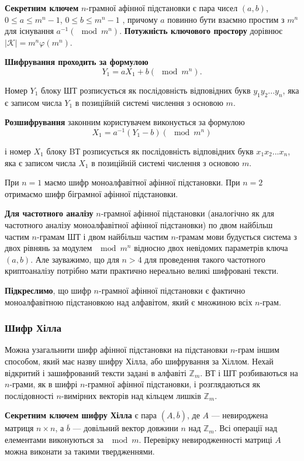 \textbf{Секретним ключем} $n$-грамної афінної підстановки є пара чисел $(a, b)$,
$0 \leqslant a \leqslant m^n - 1$, $0 \leqslant b \leqslant m^n - 1$ , причому $a$
повинно бути взаємно простим з $m^n$ для існування $a^{-1} (\mod m^n)$.
\textbf{Потужність ключового простору} дорівнює
$|\mathcal{K}| = m^n \varphi(m^n)$.

\textbf{Шифрування проходить за формулою}
$$Y_1 = a X_1 + b(\mod m^n).$$

Номер $Y_1$ блоку ШТ розписується як послідовність відповідних букв
$y_1 y_2 ... y_n$, яка є записом числа $Y_1$ в позиційній системі
числення з основою $m$.

\textbf{Розшифрування} законним користувачем виконується за формулою
$$X_1 = a^{-1} (Y_1 - b) (\mod m^n)$$

і номер $X_1$ блоку BТ розписується як послідовність відповідних букв
$x_1 x_2 ... x_n$, яка є записом числа $X_1$ в позиційній системі
числення з основою $m$.

При $n = 1$ маємо шифр моноалфавітної афінної підстановки. При
$n = 2$ отримаємо шифр біграмної афінної підстановки.

\textbf{Для частотного аналізу} $n$-грамної афінної підстановки (аналогічно як
для частотного аналізу моноалфавітної афінної підстановки) по двом
найбільш частим $n$-грамам ШТ і двом найбільш частим $n$-грамам мови
будується система з двох рівнянь за модулем $\mod m^n$ відносно двох
невідомих параметрів ключа $(a, b)$. Але зауважимо, що для $n > 4$ для
проведення такого частотного криптоаналізу потрібно мати практично
нереально великі шифровані тексти.

\textbf{Підкреслимо}, що шифр $n$-грамної афінної підстановки є фактично
моноалфавітною підстановкою над алфавітом, який є множиною всіх $n$-грам.

\subsubsection{Шифр Хілла}

Можна узагальнити шифр афінної підстановки на підстановки $n$-грам
іншим способом, який має назву шифру Хілла, або шифрування за Хіллом.
Нехай відкритий і зашифрований тексти задані в алфавіті $\mathbb{Z}_m$. ВТ
і ШТ розбиваються на $n$-грами, як в шифрі $n$-грамної афінної підстановки, і
розглядаються як послідовності $n$-вимірних векторів над кільцем лишків $\mathbb{Z}_m$.

\textbf{Секретним ключем шифру Хілла} є пара $(A, \overline{b})$, де
$A$ --- невироджена матриця $n \times n$, а $\overline{b}$ --- довільний
вектор довжини $n$ над $\mathbb{Z}_m$. Всі операції над
елементами виконуються за $\mod m$. Перевірку невиродженності матриці $A$
можна виконати за такими твердженнями.

